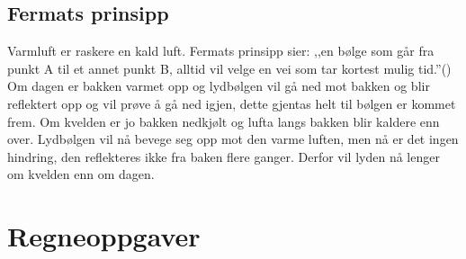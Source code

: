\documentclass[a4paper,12pt,norsk]{article}
\begin{document}
\subsection{Fermats prinsipp}
Varmluft er raskere en kald luft. Fermats prinsipp sier: ,,en bølge som går fra punkt A til et annet punkt B, alltid vil velge en vei som tar kortest mulig tid.''(\cite{snl}) Om dagen er bakken varmet opp og lydbølgen vil gå ned mot bakken og blir reflektert opp og vil prøve å gå ned igjen, dette gjentas helt til bølgen er kommet frem. Om kvelden er jo bakken nedkjølt og lufta langs bakken blir kaldere enn over. Lydbølgen vil nå bevege seg opp mot den varme luften, men nå er det ingen hindring, den reflekteres ikke fra baken flere ganger. Derfor vil lyden nå lenger om kvelden enn om dagen. 

\section{Regneoppgaver}
\end{document}
